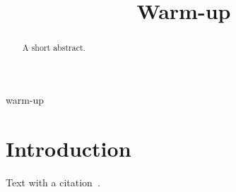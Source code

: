 \documentclass[conference]{IEEEtran}
\begin{document}
\title{Warm-up}
\author{}
\maketitle
\begin{abstract}
A short abstract.
\end{abstract}
\begin{IEEEkeywords}
warm-up
\end{IEEEkeywords}
\section{Introduction}
Text with a citation~\cite{knuth1984}.


\end{document}
